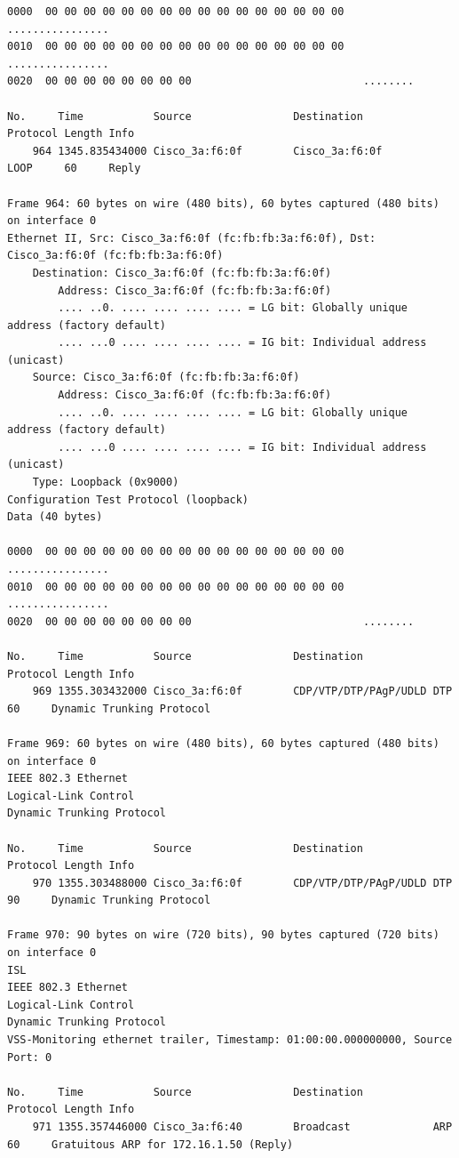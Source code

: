 \documentclass[a4paper,11pt]{article}
\begin{document}
\begin{lstlisting}
0000  00 00 00 00 00 00 00 00 00 00 00 00 00 00 00 00   ................
0010  00 00 00 00 00 00 00 00 00 00 00 00 00 00 00 00   ................
0020  00 00 00 00 00 00 00 00                           ........

No.     Time           Source                Destination           Protocol Length Info
    964 1345.835434000 Cisco_3a:f6:0f        Cisco_3a:f6:0f        LOOP     60     Reply

Frame 964: 60 bytes on wire (480 bits), 60 bytes captured (480 bits) on interface 0
Ethernet II, Src: Cisco_3a:f6:0f (fc:fb:fb:3a:f6:0f), Dst: Cisco_3a:f6:0f (fc:fb:fb:3a:f6:0f)
    Destination: Cisco_3a:f6:0f (fc:fb:fb:3a:f6:0f)
        Address: Cisco_3a:f6:0f (fc:fb:fb:3a:f6:0f)
        .... ..0. .... .... .... .... = LG bit: Globally unique address (factory default)
        .... ...0 .... .... .... .... = IG bit: Individual address (unicast)
    Source: Cisco_3a:f6:0f (fc:fb:fb:3a:f6:0f)
        Address: Cisco_3a:f6:0f (fc:fb:fb:3a:f6:0f)
        .... ..0. .... .... .... .... = LG bit: Globally unique address (factory default)
        .... ...0 .... .... .... .... = IG bit: Individual address (unicast)
    Type: Loopback (0x9000)
Configuration Test Protocol (loopback)
Data (40 bytes)

0000  00 00 00 00 00 00 00 00 00 00 00 00 00 00 00 00   ................
0010  00 00 00 00 00 00 00 00 00 00 00 00 00 00 00 00   ................
0020  00 00 00 00 00 00 00 00                           ........

No.     Time           Source                Destination           Protocol Length Info
    969 1355.303432000 Cisco_3a:f6:0f        CDP/VTP/DTP/PAgP/UDLD DTP      60     Dynamic Trunking Protocol

Frame 969: 60 bytes on wire (480 bits), 60 bytes captured (480 bits) on interface 0
IEEE 802.3 Ethernet 
Logical-Link Control
Dynamic Trunking Protocol

No.     Time           Source                Destination           Protocol Length Info
    970 1355.303488000 Cisco_3a:f6:0f        CDP/VTP/DTP/PAgP/UDLD DTP      90     Dynamic Trunking Protocol

Frame 970: 90 bytes on wire (720 bits), 90 bytes captured (720 bits) on interface 0
ISL
IEEE 802.3 Ethernet 
Logical-Link Control
Dynamic Trunking Protocol
VSS-Monitoring ethernet trailer, Timestamp: 01:00:00.000000000, Source Port: 0

No.     Time           Source                Destination           Protocol Length Info
    971 1355.357446000 Cisco_3a:f6:40        Broadcast             ARP      60     Gratuitous ARP for 172.16.1.50 (Reply)


\end{lstlisting}
\end{document}
